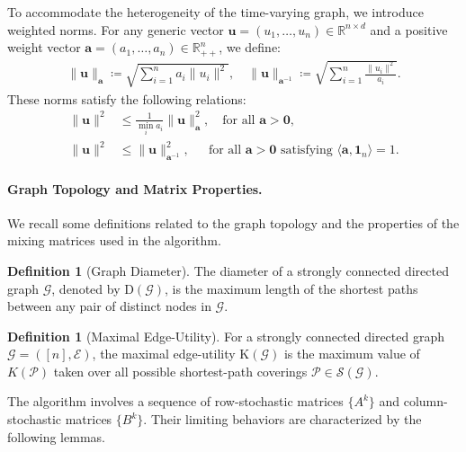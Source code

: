 \documentclass{article}
\theoremstyle{plain}
\theoremstyle{definition}
\newtheorem{definition}[theorem]{Definition}
\theoremstyle{remark}
\begin{document}
To accommodate the heterogeneity of the time-varying graph, we introduce weighted norms. For any generic vector $\mathbf{u} = (u_1, \ldots, u_n) \in \mathbb{R}^{n \times d}$ and a positive weight vector $\mathbf{a} = (a_1,\ldots, a_n )\in \mathbb{R}^n_{++}$, we define:
\begin{align*}
    \|\mathbf{u}\|_{\mathbf{a}} \coloneqq \sqrt{\sum_{i=1}^n a_i \|u_i\|^2}, \quad \|\mathbf{u}\|_{\mathbf{a}^{-1}} \coloneqq \sqrt{\sum_{i=1}^n \frac{\|u_i\|^2}{a_i}}.
\end{align*}
These norms satisfy the following relations:
\begin{align}
    \|\mathbf{u}\|^{2} &\leq \frac{1}{\min_{i} {a_i}} \|\mathbf{u}\|_{\mathbf{a}}^{2}, \quad \text{for all } \mathbf{a} > \mathbf{0}, \label{eq:norm_relation_1} \\
    \|\mathbf{u}\|^{2} &\leq \|\mathbf{u}\|_{\mathbf{a}^{-1}}^{2}, \quad \phantom{\frac{1}{a}} \text{for all } \mathbf{a} > \mathbf{0} \text{ satisfying } \langle \mathbf{a}, \mathbf{1}_n \rangle = 1. \label{eq:norm_relation_2}
\end{align}

\paragraph{Graph Topology and Matrix Properties.}  
We recall some definitions related to the graph topology and the properties of the mixing matrices used in the algorithm. 

\begin{definition}[Graph Diameter]\label{GD_def}
    The diameter of a strongly connected directed graph $\mathcal{G}$, denoted by $\mathrm{D}(\mathcal{G})$, is the maximum length of the shortest paths between any pair of distinct nodes in $\mathcal{G}$.
\end{definition}

\begin{definition}[Maximal Edge-Utility]\label{EU_def}
    For a strongly connected directed graph $\mathcal{G} = ([n], \mathcal{E})$, the maximal edge-utility $\mathrm{K}(\mathcal{G})$ is the maximum value of $K(\mathcal{P})$ taken over all possible shortest-path coverings $\mathcal{P}\in\mathcal{S}(\mathcal{G})$.
\end{definition}

The algorithm involves a sequence of row-stochastic matrices $\{A^{k}\}$ and column-stochastic matrices $\{B^{k}\}$. Their limiting behaviors are characterized by the following lemmas.
\end{document}
